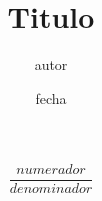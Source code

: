 \documentclass[a4paper]{article}
\title{Titulo}
\author{autor }
\date{fecha}
\begin{document}
 

	$$

		\frac{numerador}{denominador} %

	$$
\end{document}
